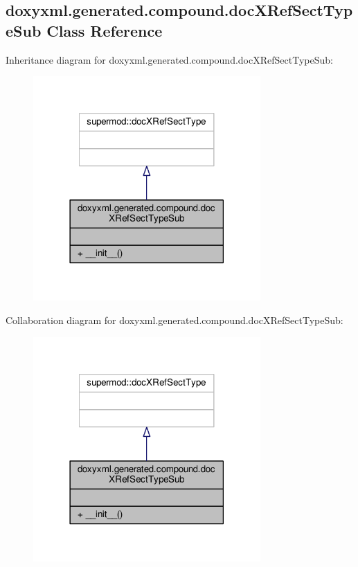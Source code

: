 \subsection{doxyxml.\+generated.\+compound.\+doc\+X\+Ref\+Sect\+Type\+Sub Class Reference}
\label{classdoxyxml_1_1generated_1_1compound_1_1docXRefSectTypeSub}


Inheritance diagram for doxyxml.\+generated.\+compound.\+doc\+X\+Ref\+Sect\+Type\+Sub\+:
\nopagebreak
\begin{figure}[H]
\begin{center}
\leavevmode
\includegraphics[width=246pt]{d4/d7c/classdoxyxml_1_1generated_1_1compound_1_1docXRefSectTypeSub__inherit__graph}
\end{center}
\end{figure}


Collaboration diagram for doxyxml.\+generated.\+compound.\+doc\+X\+Ref\+Sect\+Type\+Sub\+:
\nopagebreak
\begin{figure}[H]
\begin{center}
\leavevmode
\includegraphics[width=246pt]{df/d0f/classdoxyxml_1_1generated_1_1compound_1_1docXRefSectTypeSub__coll__graph}
\end{center}
\end{figure}
